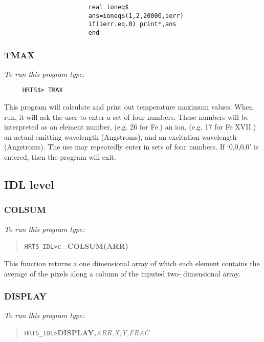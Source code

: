 \begin{verbatim}   
                       real ioneq$
                       ans=ioneq$(1,2,20000,ierr)
                       if(ierr.eq.0) print*,ans
                       end

\end{verbatim}

\subsubsection{TMAX}

{\em To run this program type:}
\begin{verbatim}   
     HRTS$> TMAX                   
\end{verbatim}
This program will calculate and print out temperature maximum values.  When
run, it will ask the user to enter a set of four numbers. These numbers will be
interpreted as an element number, (e.g. 26 for Fe.)  an ion, (e.g. 17 for Fe
XVII.) an actual emitting wavelength (Angstroms), and an excitation wavelength
(Angstroms).  The use may repeatedly enter in sets of four numbers.  If
`0,0,0,0' is entered, then the program will exit.

\subsection{IDL level}

\subsubsection{COLSUM}

{\em To run this program type:}

\begin{quote}   
     {\tt HRTS\_IDL>}{\bf c=COLSUM(ARR)}            
\end{quote}   
      This function returns a one dimensional array of which each element
   contains the average of the pixels along a column of the inputed two-
   dimensional array.

\subsubsection{DISPLAY}

{\em To run this program type:}

\begin{quote}   
      {\tt HRTS\_IDL>}{\bf DISPLAY,}{\it ARR,X,Y,FRAC}        
\end{quote}   

